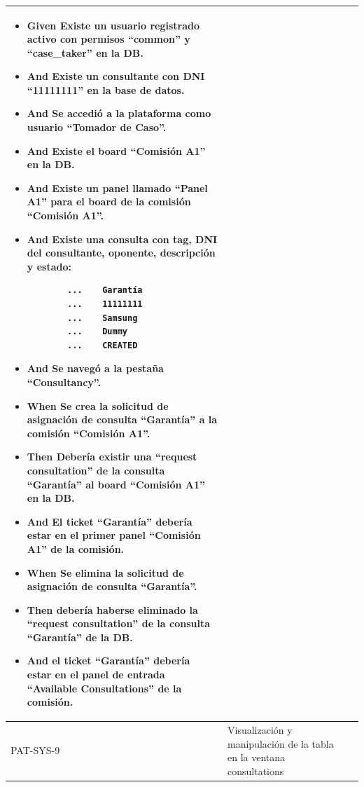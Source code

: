 \begin{longtable}{|p{1cm}|p{2.5cm}|p{12cm}|}
    \begin{itemize}
        \item \textbf{Given} Existe un usuario registrado activo con permisos ``common'' y ``case\_taker'' en la DB.
        \item \textbf{And} Existe un consultante con DNI ``11111111'' en la base de datos.
        \item \textbf{And} Se accedió a la plataforma como usuario ``Tomador de Caso''.
        \item \textbf{And} Existe el board ``Comisión A1'' en la DB.
        \item \textbf{And} Existe un panel llamado ``Panel A1'' para el board de la comisión ``Comisión A1''.
        \item \textbf{And} Existe una consulta con tag, DNI del consultante, oponente, descripción y estado:
        \begin{verbatim}
        ...    Garantía
        ...    11111111
        ...    Samsung
        ...    Dummy
        ...    CREATED
        \end{verbatim}
        \item \textbf{And} Se navegó a la pestaña ``Consultancy''.
        \newline
        \item \textbf{When} Se crea la solicitud de asignación de consulta ``Garant\'ia'' a la comisión ``Comisión A1''.
        \newline
        \item \textbf{Then} Debería existir una ``request consultation'' de la consulta ``Garant\'ia'' al board ``Comisión A1'' en la DB.
        \item \textbf{And} El ticket ``Garant\'ia'' deber\'ia estar en el primer panel ``Comisión A1'' de la comisión.
        \newline
        \item \textbf{When} Se elimina la solicitud de asignación de consulta ``Garant\'ia''.
        \newline
        \item \textbf{Then} debería haberse eliminado la ``request consultation'' de la consulta ``Garant\'ia'' de la DB.
        \item \textbf{And} el ticket ``Garant\'ia'' debería estar en el panel de entrada ``Available Consultations'' de la comisión.
    \end{itemize}
    \\
    \hline
     PAT-SYS-9 & Visualización y manipulación de la tabla en la ventana consultations &

\end{longtable}
